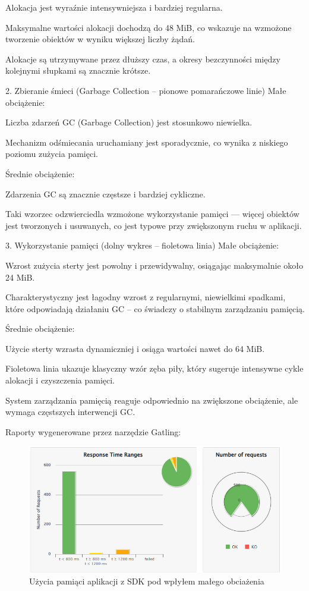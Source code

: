 \documentclass[runningheads,12pt]{llncs}
\begin{document}
Alokacja jest wyraźnie intensywniejsza i bardziej regularna.

Maksymalne wartości alokacji dochodzą do 48 MiB, co wskazuje na wzmożone tworzenie obiektów w wyniku większej liczby żądań.

Alokacje są utrzymywane przez dłuższy czas, a okresy bezczynności między kolejnymi słupkami są znacznie krótsze.

2. Zbieranie śmieci (Garbage Collection – pionowe pomarańczowe linie)
Małe obciążenie:

Liczba zdarzeń GC (Garbage Collection) jest stosunkowo niewielka.

Mechanizm odśmiecania uruchamiany jest sporadycznie, co wynika z niskiego poziomu zużycia pamięci.

Średnie obciążenie:

Zdarzenia GC są znacznie częstsze i bardziej cykliczne.

Taki wzorzec odzwierciedla wzmożone wykorzystanie pamięci — więcej obiektów jest tworzonych i usuwanych, co jest typowe przy zwiększonym ruchu w aplikacji.

3. Wykorzystanie pamięci (dolny wykres – fioletowa linia)
Małe obciążenie:

Wzrost zużycia sterty jest powolny i przewidywalny, osiągając maksymalnie około 24 MiB.

Charakterystyczny jest łagodny wzrost z regularnymi, niewielkimi spadkami, które odpowiadają działaniu GC – co świadczy o stabilnym zarządzaniu pamięcią.

Średnie obciążenie:

Użycie sterty wzrasta dynamiczniej i osiąga wartości nawet do 64 MiB.

Fioletowa linia ukazuje klasyczny wzór zęba piły, który sugeruje intensywne cykle alokacji i czyszczenia pamięci.

System zarządzania pamięcią reaguje odpowiednio na zwiększone obciążenie, ale wymaga częstszych interwencji GC.

\newpage

Raporty wygenerowane przez narzędzie Gatling:

\begin{figure}
    \includegraphics[width=\linewidth]{images/library-gatling-low-graph.jpg}
    \caption{Użycia pamiąci aplikacji z SDK pod wpłyłem małego obciażenia} \label{fig1}
\end{figure}
\end{document}
